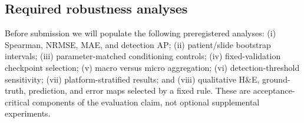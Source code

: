 \subsection{Required robustness analyses}
Before submission we will populate the following preregistered analyses: (i) Spearman, NRMSE, MAE,
and detection AP; (ii) patient/slide bootstrap intervals; (iii) parameter-matched conditioning
controls; (iv) fixed-validation checkpoint selection; (v) macro versus micro aggregation; (vi)
detection-threshold sensitivity; (vii) platform-stratified results; and (viii) qualitative H\&E,
ground-truth, prediction, and error maps selected by a fixed rule. These are acceptance-critical
components of the evaluation claim, not optional supplemental experiments.
